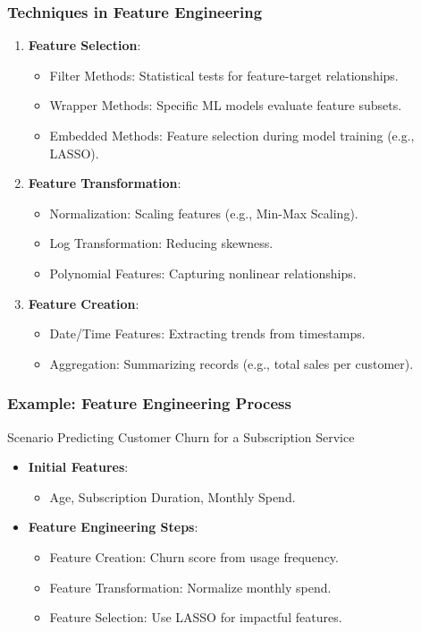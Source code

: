 \documentclass[aspectratio=169]{beamer}
\begin{document}
\begin{frame}[fragile]
    \frametitle{Techniques in Feature Engineering}
    \begin{enumerate}
        \item \textbf{Feature Selection}:
            \begin{itemize}
                \item Filter Methods: Statistical tests for feature-target relationships.
                \item Wrapper Methods: Specific ML models evaluate feature subsets.
                \item Embedded Methods: Feature selection during model training (e.g., LASSO).
            \end{itemize}
        \item \textbf{Feature Transformation}:
            \begin{itemize}
                \item Normalization: Scaling features (e.g., Min-Max Scaling).
                \item Log Transformation: Reducing skewness.
                \item Polynomial Features: Capturing nonlinear relationships.
            \end{itemize}
        \item \textbf{Feature Creation}:
            \begin{itemize}
                \item Date/Time Features: Extracting trends from timestamps.
                \item Aggregation: Summarizing records (e.g., total sales per customer).
            \end{itemize}
    \end{enumerate}
\end{frame}

\begin{frame}[fragile]
    \frametitle{Example: Feature Engineering Process}
    \begin{block}{Scenario}
        Predicting Customer Churn for a Subscription Service
    \end{block}
    \begin{itemize}
        \item \textbf{Initial Features}: 
        \begin{itemize}
            \item Age, Subscription Duration, Monthly Spend.
        \end{itemize}
        \item \textbf{Feature Engineering Steps}:
        \begin{itemize}
            \item Feature Creation: Churn score from usage frequency.
            \item Feature Transformation: Normalize monthly spend.
            \item Feature Selection: Use LASSO for impactful features.
        \end{itemize}
    \end{itemize}
\end{frame}
\end{document}
